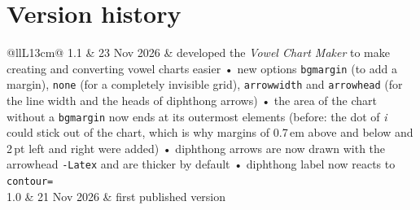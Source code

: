 \documentclass[a4paper,11pt]{article}
\newcommand\opt[1]{\texttt{#1}}
\begin{document}
\newpage
\section*{Version history}

\begin{tabular}{@{}llL{13cm}@{}}
	1.1 & 23 Nov 2026 & developed the \textit{Vowel Chart Maker} to make creating and converting vowel charts easier • new options \opt{bgmargin} (to add a margin), \opt{none} (for a completely invisible grid), \opt{arrowwidth} and \opt{arrowhead} (for the line width and the heads of diphthong arrows) • the area of the chart without a \opt{bgmargin} now ends at its outermost elements (before: the dot of \emph{i} could stick out of the chart, which is why margins of 0.7\,em above and below and 2\,pt left and right were added) • diphthong arrows are now drawn with the arrowhead \texttt{-Latex} and are thicker by default • diphthong label now reacts to \texttt{contour=} \\
	1.0 & 21 Nov 2026 & first published version
\end{tabular}
\end{document}
